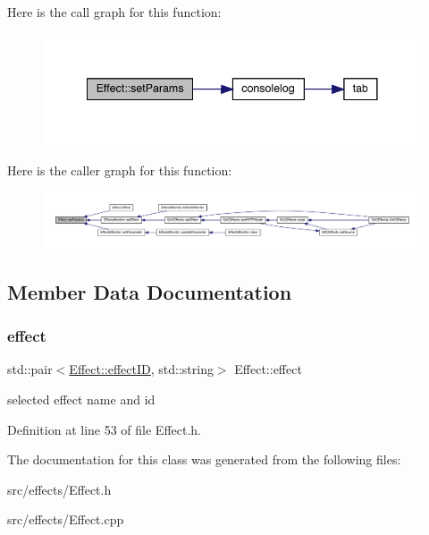 Here is the call graph for this function\+:
\nopagebreak
\begin{figure}[H]
\begin{center}
\leavevmode
\includegraphics[width=341pt]{class_effect_af0094495d423173463fd3e9cd40789af_cgraph}
\end{center}
\end{figure}
Here is the caller graph for this function\+:
\nopagebreak
\begin{figure}[H]
\begin{center}
\leavevmode
\includegraphics[width=350pt]{class_effect_af0094495d423173463fd3e9cd40789af_icgraph}
\end{center}
\end{figure}


\subsection{Member Data Documentation}
\mbox{\label{class_effect_ae23ae4e48c344fa374730a9ae24e7ad3}} 
\subsubsection{\texorpdfstring{effect}{effect}}
{\footnotesize\ttfamily std\+::pair$<$\hyperlink{class_effect_a6422fe21e9e452943fbc3344884a6fed}{Effect\+::effect\+ID}, std\+::string$>$ Effect\+::effect}

selected effect name and id 

Definition at line 53 of file Effect.\+h.



The documentation for this class was generated from the following files\+:\begin{DoxyCompactItemize}
\item 
src/effects/Effect.\+h\item 
src/effects/Effect.\+cpp\end{DoxyCompactItemize}
